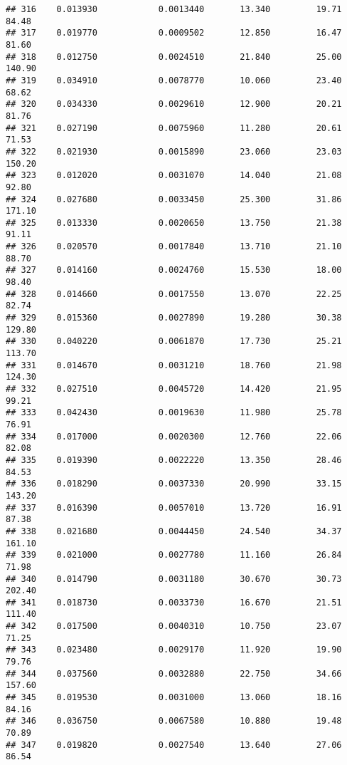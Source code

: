 \documentclass[
]{article}
\begin{document}
\begin{verbatim}
## 316    0.013930            0.0013440       13.340         19.71           84.48
## 317    0.019770            0.0009502       12.850         16.47           81.60
## 318    0.012750            0.0024510       21.840         25.00          140.90
## 319    0.034910            0.0078770       10.060         23.40           68.62
## 320    0.034330            0.0029610       12.900         20.21           81.76
## 321    0.027190            0.0075960       11.280         20.61           71.53
## 322    0.021930            0.0015890       23.060         23.03          150.20
## 323    0.012020            0.0031070       14.040         21.08           92.80
## 324    0.027680            0.0033450       25.300         31.86          171.10
## 325    0.013330            0.0020650       13.750         21.38           91.11
## 326    0.020570            0.0017840       13.710         21.10           88.70
## 327    0.014160            0.0024760       15.530         18.00           98.40
## 328    0.014660            0.0017550       13.070         22.25           82.74
## 329    0.015360            0.0027890       19.280         30.38          129.80
## 330    0.040220            0.0061870       17.730         25.21          113.70
## 331    0.014670            0.0031210       18.760         21.98          124.30
## 332    0.027510            0.0045720       14.420         21.95           99.21
## 333    0.042430            0.0019630       11.980         25.78           76.91
## 334    0.017000            0.0020300       12.760         22.06           82.08
## 335    0.019390            0.0022220       13.350         28.46           84.53
## 336    0.018290            0.0037330       20.990         33.15          143.20
## 337    0.016390            0.0057010       13.720         16.91           87.38
## 338    0.021680            0.0044450       24.540         34.37          161.10
## 339    0.021000            0.0027780       11.160         26.84           71.98
## 340    0.014790            0.0031180       30.670         30.73          202.40
## 341    0.018730            0.0033730       16.670         21.51          111.40
## 342    0.017500            0.0040310       10.750         23.07           71.25
## 343    0.023480            0.0029170       11.920         19.90           79.76
## 344    0.037560            0.0032880       22.750         34.66          157.60
## 345    0.019530            0.0031000       13.060         18.16           84.16
## 346    0.036750            0.0067580       10.880         19.48           70.89
## 347    0.019820            0.0027540       13.640         27.06           86.54

\end{verbatim}
\end{document}
